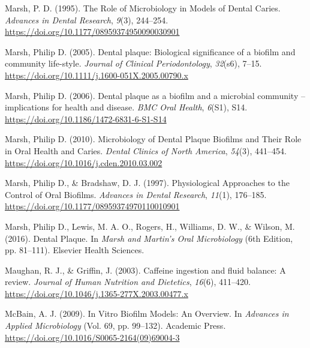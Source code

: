 \documentclass[
  letterpaper,
]{book}
\newlength{\cslhangindent}
\newlength{\cslentryspacingunit} %
\newenvironment{CSLReferences}[2] %
 {%
  \setlength{\parindent}{0pt}
  \ifodd #1
  \let\oldpar\par
  \def\par{\hangindent=\cslhangindent\oldpar}
  \fi
  \setlength{\parskip}{#2\cslentryspacingunit}
 }%
 {}
\begin{document}
\begin{CSLReferences}{1}{0}
\leavevmode{}%
Marsh, P. D. (1995). The {Role} of {Microbiology} in {Models} of {Dental
Caries}. \emph{Advances in Dental Research}, \emph{9}(3), 244--254.
\url{https://doi.org/10.1177/08959374950090030901}

\leavevmode{}%
Marsh, Philip D. (2005). Dental plaque: Biological significance of a
biofilm and community life-style. \emph{Journal of Clinical
Periodontology}, \emph{32}(s6), 7--15.
\url{https://doi.org/10.1111/j.1600-051X.2005.00790.x}

\leavevmode{}%
Marsh, Philip D. (2006). Dental plaque as a biofilm and a microbial
community -- implications for health and disease. \emph{BMC Oral
Health}, \emph{6}(S1), S14.
\url{https://doi.org/10.1186/1472-6831-6-S1-S14}

\leavevmode{}%
Marsh, Philip D. (2010). Microbiology of {Dental Plaque Biofilms} and
{Their Role} in {Oral Health} and {Caries}. \emph{Dental Clinics of
North America}, \emph{54}(3), 441--454.
\url{https://doi.org/10.1016/j.cden.2010.03.002}

\leavevmode{}%
Marsh, Philip D., \& Bradshaw, D. J. (1997). Physiological {Approaches}
to the {Control} of {Oral Biofilms}. \emph{Advances in Dental Research},
\emph{11}(1), 176--185.
\url{https://doi.org/10.1177/08959374970110010901}

\leavevmode{}%
Marsh, Philip D., Lewis, M. A. O., Rogers, H., Williams, D. W., \&
Wilson, M. (2016). Dental {Plaque}. In \emph{Marsh and {Martin}'s {Oral
Microbiology}} (6th Edition, pp. 81--111). {Elsevier Health Sciences}.

\leavevmode{}%
Maughan, R. J., \& Griffin, J. (2003). Caffeine ingestion and fluid
balance: A review. \emph{Journal of Human Nutrition and Dietetics},
\emph{16}(6), 411--420.
\url{https://doi.org/10.1046/j.1365-277X.2003.00477.x}

\leavevmode{}%
McBain, A. J. (2009). In {Vitro Biofilm Models}: {An Overview}. In
\emph{Advances in {Applied Microbiology}} (Vol. 69, pp. 99--132).
{Academic Press}. \url{https://doi.org/10.1016/S0065-2164(09)69004-3}


\end{CSLReferences}
\end{document}
